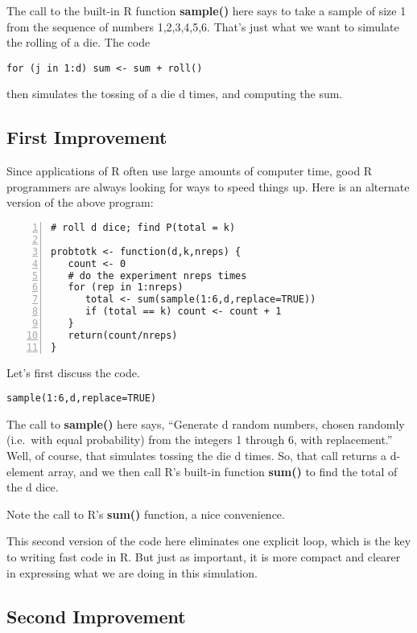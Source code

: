 The call to the built-in R function {\bf sample()} here says to take a
sample of size 1 from the sequence of numbers 1,2,3,4,5,6.  That's just
what we want to simulate the rolling of a die.  The code

\begin{Verbatim}[fontsize=\relsize{-2}]
for (j in 1:d) sum <- sum + roll()
\end{Verbatim}

then simulates the tossing of a die d times, and computing the sum.

\subsection{First Improvement}
\label{improvingsimcode}

Since applications of R often use large amounts of computer time, good R
programmers are always looking for ways to speed things up.  Here is an
alternate version of the above program:

\begin{Verbatim}[fontsize=\relsize{-2},numbers=left]
# roll d dice; find P(total = k)

probtotk <- function(d,k,nreps) {
   count <- 0
   # do the experiment nreps times
   for (rep in 1:nreps) 
      total <- sum(sample(1:6,d,replace=TRUE))
      if (total == k) count <- count + 1
   }
   return(count/nreps)
}
\end{Verbatim}

Let's first discuss the code.

\begin{Verbatim}[fontsize=\relsize{-2}]
sample(1:6,d,replace=TRUE)
\end{Verbatim}

The call to {\bf sample()} here says, ``Generate d random numbers,
chosen randomly (i.e.\ with equal probability) from the integers 1
through 6, with replacement.''  Well, of course, that simulates tossing
the die d times.  So, that call returns a d-element array, and we then
call R's built-in function {\bf sum()} to find the total of the d dice.

Note the call to R's {\bf sum()} function, a nice convenience.

This second version of the code here eliminates one explicit loop, which
is the key to writing fast code in R.  But just as important, it is more
compact and clearer in expressing what we are doing in this simulation.

\subsection{Second Improvement}

